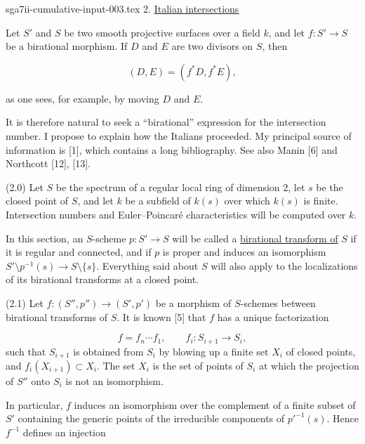 \begin{filecontents*}{sga7ii-cumulative-input-003.tex}
2. \underline{Italian intersections}

Let $S'$ and $S$ be two smooth projective surfaces over a field $k$, and let
$f:S'\longrightarrow S$ be a birational morphism.  If $D$ and $E$ are two
divisors on $S$, then

\begin{equation*}
(D,E)=(f^*D,f^*E),
\end{equation*}


as one sees, for example, by moving $D$ and $E$.

It is therefore natural to seek a ``birational'' expression for the intersection
number.  I propose to explain how the Italians proceeded.  My principal source
of information is [1], which contains a long bibliography.  See also Manin [6]
and Northcott [12], [13].

(2.0) Let $S$ be the spectrum of a regular local ring of dimension 2, let $s$ be
the closed point of $S$, and let $k$ be a subfield of $k(s)$ over which $k(s)$ is
finite.  Intersection numbers and Euler--Poincaré characteristics will be
computed over $k$.

In this section, an $S$-scheme $p:S'\longrightarrow S$ will be called a
\underline{birational transform of} $S$ if it is regular and connected, and if
$p$ is proper and induces an isomorphism
$S'\setminus p^{-1}(s)\longrightarrow S\setminus\{s\}$.  Everything said about
$S$ will also apply to the localizations of its birational transforms at a
closed point.

(2.1) Let $f:(S'',p'')\longrightarrow(S',p')$ be a morphism of $S$-schemes
between birational transforms of $S$.  It is known [5] that $f$ has a unique
factorization

\begin{equation*}
f=f_n\cdots f_1,\qquad f_i:S_{i+1}\longrightarrow S_i,
\end{equation*}
such that $S_{i+1}$ is obtained from $S_i$ by blowing up a finite set $X_i$ of
closed points, and $f_i(X_{i+1})\subset X_i$.  The set $X_i$ is the set of points
of $S_i$ at which the projection of $S''$ onto $S_i$ is not an isomorphism.

In particular, $f$ induces an isomorphism over the complement of a finite subset
of $S'$ containing the generic points of the irreducible components of
$p'^{-1}(s)$.  Hence $f^{-1}$ defines an injection


\end{filecontents*}
